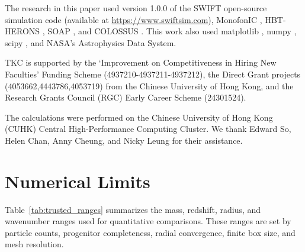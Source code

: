\documentclass[
 reprint,
 superscriptaddress,
 nofootinbib,
 nobibnotes,
 amsmath,
 amssymb,
 aps,
 prd,
 floatfix,
 longbibliography
]{revtex4-2}
\DeclareRobustCommand{\change}[1]{#1}
\begin{document}
\begin{acknowledgments}


\change{The research in this paper used version 1.0.0 of the {\small SWIFT} open-source simulation code \citep{Schaller2024SWIFT} (available at \url{https://www.swiftsim.com}), {\small MonofonIC} \citep{Hahn2020MUSIC2monofonIC,Michaux2021MUSIC2monofonIC}, {\small HBT-HERONS} \citep{Victor25HBTHERONS}, {\small SOAP} \citep{McGibbon2025SOAP}, and {\small COLOSSUS} \citep{Diemer2018}. This work also used matplotlib \citep{Hunt07matplotlib}, numpy \citep{vand11numpy}, scipy \citep{Virt20scipy}, and NASA's Astrophysics Data System.}


TKC is supported by the `Improvement on Competitiveness in Hiring New Faculties' Funding Scheme (4937210-4937211-4937212), the Direct Grant projects (4053662,4443786,4053719) from the Chinese University of Hong Kong, and the Research Grants Council (RGC) Early Career Scheme (24301524).

The calculations were performed on the Chinese University of Hong Kong (CUHK) Central High-Performance Computing Cluster. We thank Edward So, Helen Chan, Anny Cheung, and Nicky Leung for their assistance.

\end{acknowledgments}

\clearpage

\appendix

\section{\texorpdfstring{Numerical Limits}{Numerical Limits}}
\label{app:trusted_ranges}


Table~\ref{tab:trusted_ranges} summarizes the mass, redshift, radius, and wavenumber ranges used for quantitative comparisons. These ranges are set by particle counts, progenitor completeness, radial convergence, finite box size, and mesh resolution.
\end{document}
